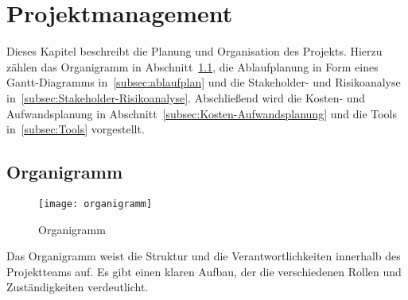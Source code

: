 \section{Projektmanagement}\label{sec:projektmanagement}

Dieses Kapitel beschreibt die Planung und Organisation des Projekts.
Hierzu zählen das Organigramm in Abschnitt~\ref{subsec:Organigramm}, die Ablaufplanung in Form eines Gantt-Diagramms in~\ref{subsec:ablaufplan} und die Stakeholder- und Risikoanalyse in~\ref{subsec:Stakeholder-Risikoanalyse}.
Abschließend wird die Kosten- und Aufwandsplanung in Abschnitt~\ref{subsec:Kosten-Aufwandsplanung} und die Tools in~\ref{subsec:Tools} vorgestellt.

\subsection{Organigramm}\label{subsec:Organigramm}

\begin{figure}[H]
    \centering
    \texttt{[image: organigramm]}
    \caption{Organigramm}\label{fig:organigramm}
\end{figure}

Das Organigramm weist die Struktur und die Verantwortlichkeiten innerhalb des Projektteams auf.
Es gibt einen klaren Aufbau, der die verschiedenen Rollen und Zuständigkeiten verdeutlicht.

